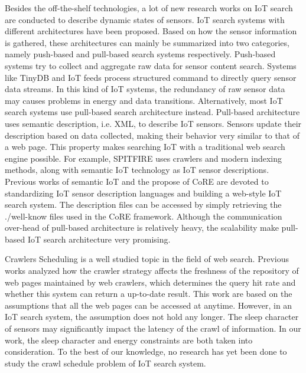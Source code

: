 \documentclass[conference]{IEEEtran}
\begin{document}
Besides the off-the-shelf technologies, a lot of new research works on IoT search are conducted to describe dynamic states of sensors. 
IoT search systems with different architectures have been proposed.
Based on how the sensor information is gathered, these architectures can mainly be summarized into two categories, namely push-based and pull-based search systems respectively.
Push-based systems try to collect and aggregate raw data for sensor content search.
Systems like TinyDB\cite{TinyDB} and IoT feeds\cite{Whitehouse2006} process structured command to directly query sensor data streams. 
In this kind of IoT systems, the redundancy of raw sensor data may causes problems in energy and data transitions.
Alternatively, most IoT search systems use pull-based search architecture instead.
Pull-based architecture uses semantic description, i.e. XML, to describe IoT sensors. 
Sensors update their description based on data collected, making their behavior very similar to that of a web page.
This property makes searching IoT with a traditional web search engine possible. 
For example, SPITFIRE\cite{SPITFIRE} uses crawlers and modern indexing methods, along with semantic IoT technology as IoT sensor descriptions. 
Previous works of semantic IoT\cite{Compton2012} and the propose of CoRE\cite{CoREWorkingGroup2012} are devoted to standardizing IoT sensor description languages and building a web-style IoT search system. 
The description files can be accessed by simply retrieving the ./well-know files used in the CoRE framework. 
Although the communication over-head of pull-based architecture is relatively heavy, the scalability make pull-based IoT search architecture very promising.

Crawlers Scheduling is a well studied topic in the field of web search. 
Previous works\cite{Cho2000}\cite{Wolf2002}\cite{Challenger2004} analyzed how the crawler strategy affects the freshness of the repository of web pages maintained by web crawlers, which determines the query hit rate and whether this system can return a up-to-date result. 
This work are based on the assumptions that all the web pages can be accessed at anytime.
However, in an IoT search system, the assumption does not hold any longer.
The sleep character of sensors may significantly impact the latency of the crawl of information.
In our work, the sleep character and energy constraints are both taken into consideration.
To the best of our knowledge, no research has yet been done to study the crawl schedule problem of IoT search system.
\end{document}
